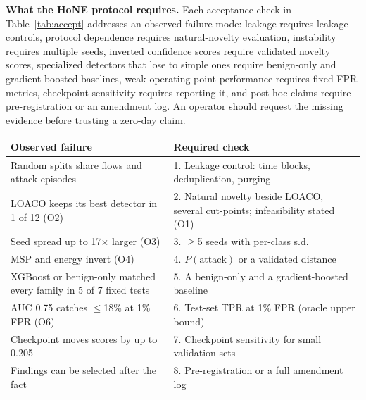 \documentclass[conference]{IEEEtran}
\begin{document}
\textbf{What the HoNE protocol requires.}
Each acceptance check in Table~\ref{tab:accept} addresses an observed failure mode: leakage requires leakage controls, protocol dependence requires natural-novelty evaluation, instability requires multiple seeds, inverted confidence scores require validated novelty scores, specialized detectors that lose to simple ones require benign-only and gradient-boosted baselines, weak operating-point performance requires fixed-FPR metrics, checkpoint sensitivity requires reporting it, and post-hoc claims require pre-registration or an amendment log. An operator should request the missing evidence before trusting a zero-day claim.

\par\medskip\noindent
\begin{minipage}{\columnwidth}
\centering
\footnotesize

\renewcommand{\arraystretch}{1.35}

\label{tab:accept}

\begin{tabular*}{0.97\columnwidth}{@{\extracolsep{\fill}}
p{}
p{}@{}}
\toprule
\textbf{Observed failure} & \textbf{Required check}\\
\midrule
Random splits share flows and attack episodes~\cite{arp2022}
& 1. Leakage control: time blocks, deduplication, purging\\

LOACO keeps its best detector in 1 of 12 (O2)
& 2. Natural novelty beside LOACO, several cut-points; infeasibility stated (O1)\\

Seed spread up to 17$\times$ larger (O3)
& 3. $\geq$5 seeds with per-class s.d.\\

MSP and energy invert (O4)
& 4. $P(\text{attack})$ or a validated distance\\

XGBoost or benign-only matched every family in 5 of 7 fixed tests
& 5. A benign-only and a gradient-boosted baseline\\

AUC 0.75 catches $\leq$18\% at 1\% FPR (O6)
& 6. Test-set TPR at 1\% FPR (oracle upper bound)\\

Checkpoint moves scores by up to 0.205
& 7. Checkpoint sensitivity for small validation sets\\

Findings can be selected after the fact
& 8. Pre-registration or a full amendment log\\
\bottomrule
\end{tabular*}

\end{minipage}
\par\medskip
\end{document}
